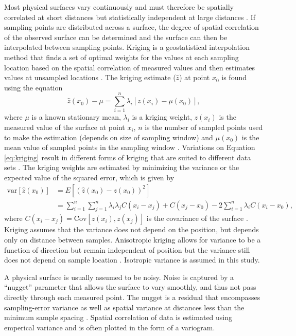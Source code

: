 \documentclass{sfuthesis}
\begin{document}
Most physical surfaces vary continuously and must therefore be spatially correlated at short distances but statistically independent at large distances \citep{Davis1986}. If sampling points are distributed across a surface, the degree of spatial correlation of the observed surface can be determined and the surface can then be interpolated between sampling points. Kriging is a geostatistical interpolation method that finds a set of optimal weights for the values at each sampling location based on the spatial correlation of measured values and then estimates values at unsampled locations \citep{Davis1986, Li2014}. The kriging estimate ($\hat{z}$) at point $x_0$ is found using the equation
\begin{equation}
\label{eq:kriging}
\hat{z}(x_0) - \mu = \sum_{i=1}^{n} \lambda_i [z(x_i)-\mu(x_0)],
\end{equation}
where $\mu$ is a known stationary mean, $\lambda_i$ is a kriging weight, $z(x_i)$ is the measured value of the surface at point $x_i$, $n$ is the number of sampled points used to make the estimation (depends on size of sampling window) and $\mu(x_0)$ is the mean value of sampled points in the sampling window \citep{Wackernagel2003, Li2008}. Variations on Equation \ref{eq:kriging} result in different forms of kriging that are suited to different data sets \cite[][and sources within]{Li2014}. The kriging weights are estimated by minimizing the variance or the expected value of the squared error, which is given by
\begin{align}
\mathrm{var}[\hat{z}(x_0)] &= E[(\hat{z}(x_0)-z(x_0))^2]\\
&=\sum_{i=1}^{n}\sum_{j=1}^{n}\lambda_i \lambda_j C(x_i-x_j)+C(x_j-x_0)-2 \sum_{i=1}^{n} \lambda_i C(x_i-x_0),
\end{align}
where $C(x_i-x_j) = \mathrm{Cov}[z(x_i),z(x_j)]$ is the covariance of the surface \citep{Li2008}. Kriging assumes that the variance does not depend on the position, but depends only on distance between samples.  Anisotropic kriging allows for variance to be a function of direction but remain independent of position but the variance still does not depend on sample location \citep{Davis1986, Li2014}. Isotropic variance is assumed in this study.

A physical surface is usually assumed to be noisy. Noise is captured by a ``nugget'' parameter that allows the surface to vary smoothly, and thus not pass directly through each measured point. The nugget is a residual that encompasses sampling-error variance as well as spatial variance at distances less than the minimum sample spacing \citep{Li2008}. Spatial correlation of data is estimated using emperical variance and is often plotted in the form of a variogram.  
\end{document}
